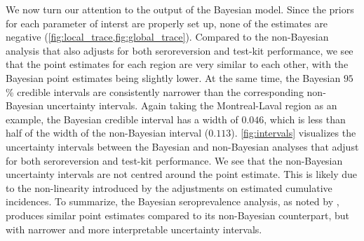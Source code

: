 We now turn our attention to the output of the Bayesian model. Since the priors for each parameter of interst are properly set up, none of the estimates are negative (\cref{fig:local_trace,fig:global_trace}). Compared to the non-Bayesian analysis that also adjusts for both seroreversion and test-kit performance, we see that the point estimates for each region are very similar to each other, with the Bayesian point estimates being slightly lower. At the same time, the Bayesian $95$\% credible intervals are consistently narrower than the corresponding non-Bayesian uncertainty intervals. Again taking the Montreal-Laval region as an example, the Bayesian credible interval has a width of $0.046$, which is less than half of the width of the non-Bayesian interval ($0.113$). \cref{fig:intervals} visualizes the uncertainty intervals between the Bayesian and non-Bayesian analyses that adjust for both seroreversion and test-kit performance. We see that the non-Bayesian uncertainty intervals are not centred around the point estimate. This is likely due to the non-linearity introduced by the adjustments on estimated cumulative incidences. To summarize, the Bayesian seroprevalence analysis, as noted by \cite{meyer2022adjusting}, produces similar point estimates compared to its non-Bayesian counterpart, but with narrower and more interpretable uncertainty intervals.

